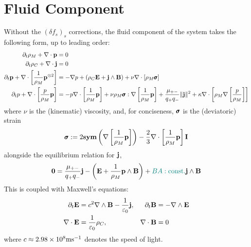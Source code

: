 \chapter{Fluid Component}

     Without the $(\delta f_{s})_{s}$ corrections, the fluid component of the system takes the following form, up to leading order: 
    {\small \begin{align}
        \partial_{t}\rho_{M} + \nabla\cdot\mathbf{p}  &=  0  \\
        \partial_{t}\rho_{C} + \nabla\cdot\mathbf{j}  &=  0  \\
        \partial_{t}\mathbf{p} + \nabla\cdot\left[\frac{1}{\rho_{M}}\mathbf{p}^{\otimes 2}\right]  &=  - \nabla p + (\rho_{C}\mathbf{E} + \mathbf{j}\wedge\mathbf{B}) + \nu\nabla\cdot[\rho_{M}\pmb{\mathsf{\sigma}}]  \\
        \partial_{t}p + \nabla\cdot\left[\frac{p}{\rho_{M}}\mathbf{p}\right]  &=  - p\nabla\cdot\left[\frac{1}{\rho_{M}}\mathbf{p}\right] + \nu\rho_{M}\pmb{\mathsf{\sigma}}:\nabla\left[\frac{1}{\rho_{M}}\mathbf{p}\right] + \frac{\mu_{+-}}{q_{+}q_{-}}\|\mathbf{j}\|^{2} + \kappa\nabla\cdot\left[\rho_{M}\nabla\left[\frac{p}{\rho_{M}}\right]\right]
    \end{align}}
    where $\nu$ is the (kinematic) viscosity, and, for conciseness, $\pmb{\mathsf{\sigma}}$ is the (deviatoric) strain
    \begin{equation}\label{eqn:strain equation}
        \pmb{\mathsf{\sigma}}  :=  2\mathbf{sym}\left(\nabla\left[\frac{1}{\rho_{M}}\mathbf{p}\right]\right) - \frac{2}{3}\nabla\cdot\left[\frac{1}{\rho_{M}}\mathbf{p}\right]\mathbf{I}
    \end{equation}
    alongside the equilibrium relation for $\mathbf{j}$,
    \begin{equation}
        \mathbf{0}  =  \frac{\mu_{+-}}{q_{+}q_{-}}\mathbf{j} - \left(\mathbf{E} + \frac{1}{\rho_{M}}\mathbf{p}\wedge\mathbf{B}\right) + \textcolor{teal}{BA: \rm const.}\mathbf{j}\wedge\mathbf{B}
    \end{equation}
    This is coupled with Maxwell's equations:
    \begin{align*}
        \partial_{t}\mathbf{E}  &=  c^{2}\nabla\wedge\mathbf{B} - \frac{1}{\varepsilon_{0}}\mathbf{j},  &
        \partial_{t}\mathbf{B}  &=  - \nabla\wedge\mathbf{E}  \\
        \nabla\cdot\mathbf{E}  &=  \frac{1}{\varepsilon_{0}}\rho_{C},  &
        \nabla\cdot\mathbf{B}  &=  0
    \end{align*}
    where $c \approx 2.98\times 10^{8}\mathrm{m}\mathrm{s}^{- 1}$ denotes the speed of light.

